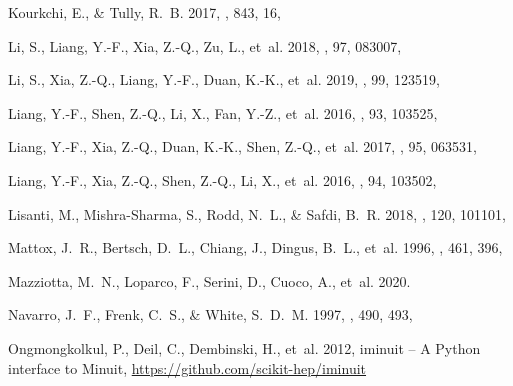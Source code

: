 \documentclass[
	twocolumn,
]{aastex6} %
\begin{document}
\begin{thebibliography}{}
	{Kourkchi}, E., \& {Tully}, R.~B. 2017, \apj, 843, 16,
	
	{Li}, S., {Liang}, Y.-F., {Xia}, Z.-Q., {Zu}, L., {et~al.} 2018, \prd, 97,
	  083007, 
	
	{Li}, S., {Xia}, Z.-Q., {Liang}, Y.-F., {Duan}, K.-K., {et~al.} 2019, \prd, 99,
	  123519, 
	
	{Liang}, Y.-F., {Shen}, Z.-Q., {Li}, X., {Fan}, Y.-Z., {et~al.}
	  2016{}, \prd, 93, 103525, 
	
	{Liang}, Y.-F., {Xia}, Z.-Q., {Duan}, K.-K., {Shen}, Z.-Q., {et~al.} 2017,
	  \prd, 95, 063531, 
	
	{Liang}, Y.-F., {Xia}, Z.-Q., {Shen}, Z.-Q., {Li}, X., {et~al.}
	  2016{}, \prd, 94, 103502, 
	
	{Lisanti}, M., {Mishra-Sharma}, S., {Rodd}, N.~L., \& {Safdi}, B.~R. 2018,
	  \prl, 120, 101101, 
	
	{Mattox}, J.~R., {Bertsch}, D.~L., {Chiang}, J., {Dingus}, B.~L., {et~al.}
	  1996, \apj, 461, 396, 
	
	{Mazziotta}, M.~N., {Loparco}, F., {Serini}, D., {Cuoco}, A., {et~al.} 2020.
	\newblock {}
	
	{Navarro}, J.~F., {Frenk}, C.~S., \& {White}, S.~D.~M. 1997, \apj, 490, 493,
	
	Ongmongkolkul, P., Deil, C., Dembinski, H., {et~al.} 2012, iminuit -- A Python
	  interface to Minuit, \url{https://github.com/scikit-hep/iminuit}
	

\end{thebibliography}
\end{document}
